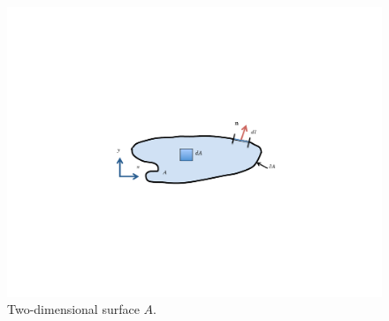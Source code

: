 \documentclass[11pt]{report}
\begin{document}
\begin{figure}[htbp]
 \center
 \includegraphics[trim=3.2in 3.2in 3.0in 3.5in, clip=true, scale=0.8]{f/A_surface.pdf}
 \caption{Two-dimensional surface $A$.}
 \label{fig:2D domain}
\end{figure}
\end{document}

